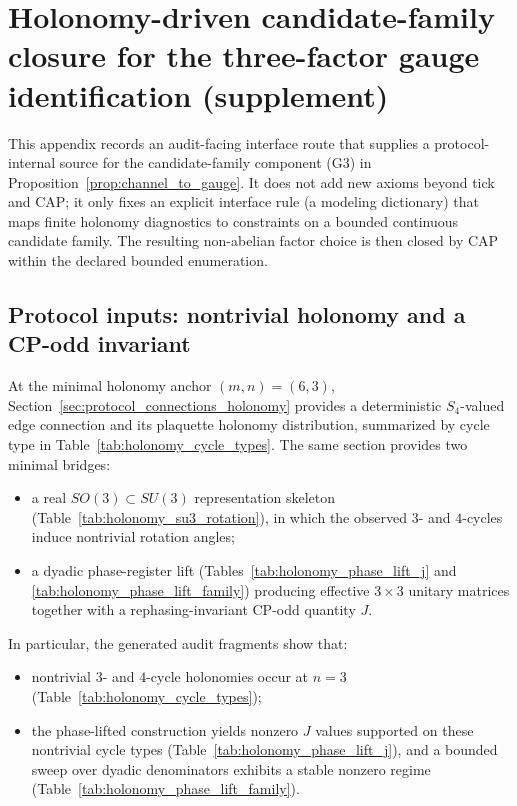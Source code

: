 \section{Holonomy-driven candidate-family closure for the three-factor gauge identification (supplement)}
\label{app:gauge3_holonomy_candidate_closure}

\AuditTag This appendix records an audit-facing interface route that supplies a protocol-internal source for the candidate-family component (G3) in Proposition~\ref{prop:channel_to_gauge}.
It does not add new axioms beyond tick and CAP; it only fixes an explicit interface rule (a modeling dictionary) that maps finite holonomy diagnostics to constraints on a bounded continuous candidate family.
The resulting non-abelian factor choice is then closed by CAP within the declared bounded enumeration.

\subsection{Protocol inputs: nontrivial holonomy and a CP-odd invariant}
\label{subsec:gauge3_holonomy_inputs}

At the minimal holonomy anchor $(m,n)=(6,3)$, Section~\ref{sec:protocol_connections_holonomy} provides a deterministic $S_4$-valued edge connection and its plaquette holonomy distribution, summarized by cycle type in Table~\ref{tab:holonomy_cycle_types}.
The same section provides two minimal bridges:
\begin{itemize}
  \item a real $SO(3)\subset SU(3)$ representation skeleton (Table~\ref{tab:holonomy_su3_rotation}), in which the observed $3$- and $4$-cycles induce nontrivial rotation angles;
  \item a dyadic phase-register lift (Tables~\ref{tab:holonomy_phase_lift_j} and \ref{tab:holonomy_phase_lift_family}) producing effective $3\times 3$ unitary matrices together with a rephasing-invariant CP-odd quantity $J$.
\end{itemize}
In particular, the generated audit fragments show that:
\begin{itemize}
  \item nontrivial $3$- and $4$-cycle holonomies occur at $n=3$ (Table~\ref{tab:holonomy_cycle_types});
  \item the phase-lifted construction yields nonzero $J$ values supported on these nontrivial cycle types (Table~\ref{tab:holonomy_phase_lift_j}), and a bounded sweep over dyadic denominators exhibits a stable nonzero regime (Table~\ref{tab:holonomy_phase_lift_family}).
\end{itemize}

